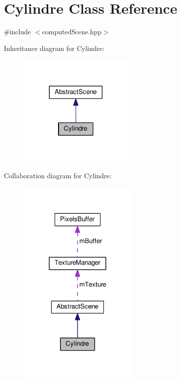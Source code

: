 \hypertarget{class_cylindre}{\section{Cylindre Class Reference}
\label{class_cylindre}
}


{\ttfamily \#include $<$computed\+Scene.\+hpp$>$}



Inheritance diagram for Cylindre\+:
\nopagebreak
\begin{figure}[H]
\begin{center}
\leavevmode
\includegraphics[width=161pt]{class_cylindre__inherit__graph}
\end{center}
\end{figure}


Collaboration diagram for Cylindre\+:
\nopagebreak
\begin{figure}[H]
\begin{center}
\leavevmode
\includegraphics[width=169pt]{class_cylindre__coll__graph}
\end{center}
\end{figure}
